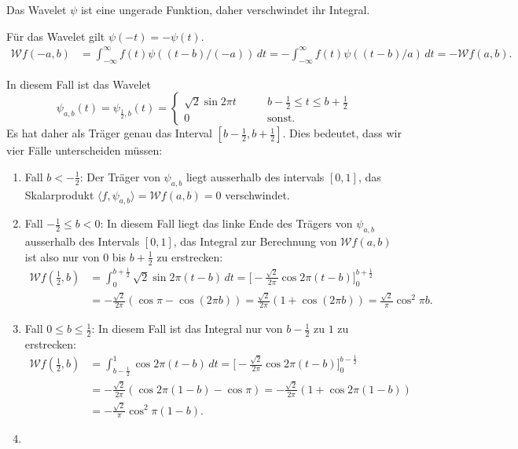 \begin{loesung}
\begin{teilaufgaben}
%
\item
Das Wavelet $\psi$ ist eine ungerade Funktion, daher verschwindet ihr
Integral.
%
%
\item
Für das Wavelet gilt $\psi(-t)=-\psi(t)$.
\begin{align*}
\mathcal{W}f(-a,b)
&=
\int_{-\infty}^\infty f(t)\psi((t-b)/(-a))\,dt
=
-\int_{-\infty}^\infty f(t)\psi((t-b)/a)\,dt
=
-\mathcal{W}f(a,b).
\end{align*}
%
%
%
\item
In diesem Fall ist das Wavelet
\[
\psi_{a,b}(t)
=
\psi_{\frac12,b}(t)
=
\begin{cases}
\sqrt{2}\sin 2\pi t&\qquad b-\frac12\le t\le b+\frac12
\\
0&\qquad\text{sonst.}
\end{cases}
\]
Es hat daher als Träger genau das Interval $[b-\frac12,b+\frac12]$.
Dies bedeutet, dass wir vier Fälle unterscheiden müssen:
\begin{enumerate}
\item
Fall $b < -\frac12$:  Der Träger von $\psi_{a,b}$ liegt ausserhalb des
intervals $[0,1]$, das Skalarprodukt
$\langle f,\psi_{a,b}\rangle=\mathcal{W}f(a,b)=0$ verschwindet.
\item
Fall $-\frac12\le b < 0$: In diesem Fall liegt das linke Ende des Trägers
von $\psi_{a,b}$ ausserhalb des Intervals $[0,1]$, das Integral zur Berechnung
von $\mathcal{W}f(a,b)$ ist also nur von $0$ bis $b+\frac12$ zu erstrecken:
\begin{align*}
\mathcal{W}f({\textstyle\frac12},b)
&=
\int_{0}^{b+\frac12} \sqrt{2} \sin 2\pi(t-b)\,dt
=
\biggl[
-
\frac{\sqrt{2}}{2\pi}
\cos 2\pi(t-b)
\biggr]_0^{b+\frac12}
\\
&=
-\frac{\sqrt{2}}{2\pi}(\cos\pi - \cos(2\pi b))
=
\frac{\sqrt{2}}{2\pi}(1+\cos(2\pi b))
=
\frac{\sqrt{2}}{\pi}
\cos^2 \pi b.
\end{align*}
\item
Fall $0\le b \le \frac12$: In diesem Fall ist das Integral nur von $b-\frac12$
zu $1$ zu erstrecken:
\begin{align*}
\mathcal{W}f({\textstyle\frac12},b)
&=
\int_{b-\frac12}^1 \cos 2\pi (t-b)\,dt
=
\biggl[
-\frac{\sqrt{2}}{2\pi}\cos 2\pi(t-b)
\biggr]_0^{b-\frac12}
\\
&=
-\frac{\sqrt{2}}{2\pi}(
\cos 2\pi(1-b)
-
\cos \pi
)
=
-\frac{\sqrt{2}}{2\pi}(1+\cos 2\pi(1-b))
\\
&=
-\frac{\sqrt{2}}{\pi}\cos^2\pi(1-b).
\end{align*}
\item

\end{enumerate}
\end{teilaufgaben}
\end{loesung}
